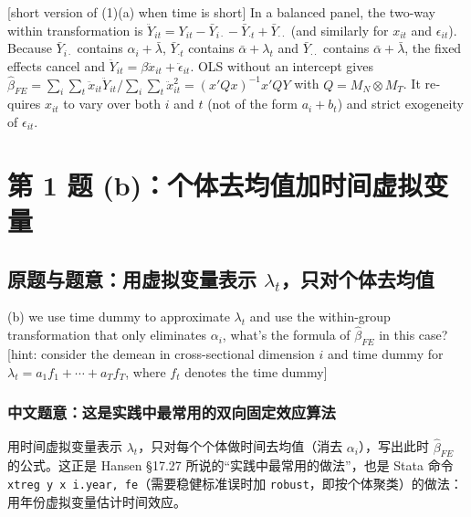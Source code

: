 \begin{english}[short version of (1)(a) when time is short]
In a balanced panel, the two-way within transformation is $\ddot Y_{it}=Y_{it}-\bar Y_{i\cdot}-\bar Y_{\cdot t}+\bar Y_{\cdot\cdot}$ (and similarly for $x_{it}$ and $\epsilon_{it}$). Because $\bar Y_{i\cdot}$ contains $\alpha_i+\bar\lambda$, $\bar Y_{\cdot t}$ contains $\bar\alpha+\lambda_t$ and $\bar Y_{\cdot\cdot}$ contains $\bar\alpha+\bar\lambda$, the fixed effects cancel and $\ddot Y_{it}=\beta\ddot x_{it}+\ddot\epsilon_{it}$. OLS without an intercept gives $\hat\beta_{FE}=\sum_i\sum_t\ddot x_{it}\ddot Y_{it}/\sum_i\sum_t\ddot x_{it}^2=(x'Qx)^{-1}x'QY$ with $Q=M_N\otimes M_T$. It requires $x_{it}$ to vary over both $i$ and $t$ (not of the form $a_i+b_t$) and strict exogeneity of $\epsilon_{it}$.
\end{english}

\section{第 1 题 (b)：个体去均值加时间虚拟变量}\label{sec:U17a-q1b}

\subsection{原题与题意：用虚拟变量表示 \texorpdfstring{$\lambda_t$}{lambda\_t}，只对个体去均值}

\begin{tcolorbox}[bxbase,colback=ceng!3,colframe=ceng,boxed title style={colback=ceng},fontupper=\small,title={原题 (1)(b)}]
(b) we use time dummy to approximate $\lambda_t$ and use the within-group transformation that only eliminates $\alpha_i$, what's the formula of $\hat\beta_{FE}$ in this case? [hint: consider the demean in cross-sectional dimension $i$ and time dummy for $\lambda_t=a_1f_1+\cdots+a_Tf_T$, where $f_t$ denotes the time dummy]
\end{tcolorbox}

\subsubsection{中文题意：这是实践中最常用的双向固定效应算法}
用时间虚拟变量表示 $\lambda_t$，只对每个个体做时间去均值（消去 $\alpha_i$），写出此时 $\hat\beta_{FE}$ 的公式。这正是 Hansen §17.27 所说的“实践中最常用的做法”，也是 Stata 命令 \texttt{xtreg y x i.year, fe}（需要稳健标准误时加 \texttt{robust}，即按个体聚类）的做法：用年份虚拟变量估计时间效应。

